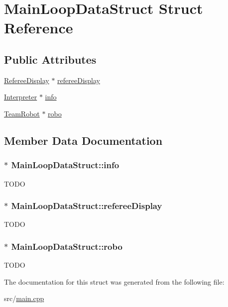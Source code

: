 \hypertarget{structMainLoopDataStruct}{
\section{MainLoopDataStruct Struct Reference}
\label{structMainLoopDataStruct}
}
\subsection*{Public Attributes}
\begin{DoxyCompactItemize}
\item 
\hyperlink{classRefereeDisplay}{RefereeDisplay} $\ast$ \hyperlink{structMainLoopDataStruct_aa273613df69e543077da8ce912276ac5}{refereeDisplay}
\item 
\hyperlink{classInterpreter}{Interpreter} $\ast$ \hyperlink{structMainLoopDataStruct_ac4fccc92ef0456a58ec4841007534f3b}{info}
\item 
\hyperlink{classTeamRobot}{TeamRobot} $\ast$ \hyperlink{structMainLoopDataStruct_a4d464e12c4d8f8ac1fc882c75753597b}{robo}
\end{DoxyCompactItemize}


\subsection{Member Data Documentation}
\hypertarget{structMainLoopDataStruct_ac4fccc92ef0456a58ec4841007534f3b}{
\subsubsection[{info}]{$\ast$ {\bf MainLoopDataStruct::info}}}
\label{structMainLoopDataStruct_ac4fccc92ef0456a58ec4841007534f3b}
TODO \hypertarget{structMainLoopDataStruct_aa273613df69e543077da8ce912276ac5}{
\subsubsection[{refereeDisplay}]{$\ast$ {\bf MainLoopDataStruct::refereeDisplay}}}
\label{structMainLoopDataStruct_aa273613df69e543077da8ce912276ac5}
TODO \hypertarget{structMainLoopDataStruct_a4d464e12c4d8f8ac1fc882c75753597b}{
\subsubsection[{robo}]{$\ast$ {\bf MainLoopDataStruct::robo}}}
\label{structMainLoopDataStruct_a4d464e12c4d8f8ac1fc882c75753597b}
TODO 

The documentation for this struct was generated from the following file:\begin{DoxyCompactItemize}
\item 
src/\hyperlink{main_8cpp}{main.cpp}\end{DoxyCompactItemize}
